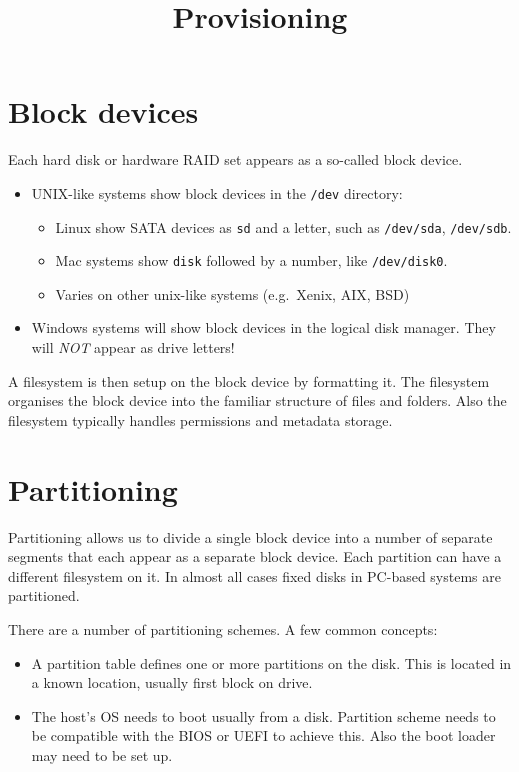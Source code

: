 \documentclass[slides]{pgnotes}
\title{Provisioning}
\begin{document}
\maketitle

\tableofcontents

\section{Block devices}
\label{sec:block-devices}

Each hard disk or hardware RAID set appears as a so-called block device.

\begin{itemize}
\item
  UNIX-like systems show block devices in the \texttt{/dev} directory:

  \begin{itemize}
  \item
    Linux show SATA devices as \texttt{sd} and a letter, such as
    \texttt{/dev/sda}, \texttt{/dev/sdb}.
  \item
    Mac systems show \texttt{disk} followed by a number, like
    \texttt{/dev/disk0}.
  \item
    Varies on other unix-like systems (e.g.~Xenix, AIX, BSD)
  \end{itemize}
\item
  Windows systems will show block devices in the logical disk manager.
  They will \emph{NOT} appear as drive letters!
\end{itemize}

A filesystem is then setup on the block device by formatting it. The
filesystem organises the block device into the familiar structure of
files and folders. Also the filesystem typically handles permissions and
metadata storage.

\section{Partitioning}
\label{sec:partitioning}

Partitioning allows us to divide a single block device into a number of
separate segments that each appear as a separate block device. Each
partition can have a different filesystem on it. In almost all cases
fixed disks in PC-based systems are partitioned.

There are a number of partitioning schemes. A few common concepts:

\begin{itemize}
\item
  A partition table defines one or more partitions on the disk. This is
  located in a known location, usually first block on drive.
\item
  The host's OS needs to boot usually from a disk. Partition scheme
  needs to be compatible with the BIOS or UEFI to achieve this. Also the
  boot loader may need to be set up.
\end{itemize}
\end{document}
